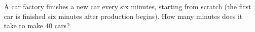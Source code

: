 A car factory finishes a new car every six minutes, starting from scratch (the first car is finished six minutes after production begins). How many minutes does it take to make $40$ cars?
